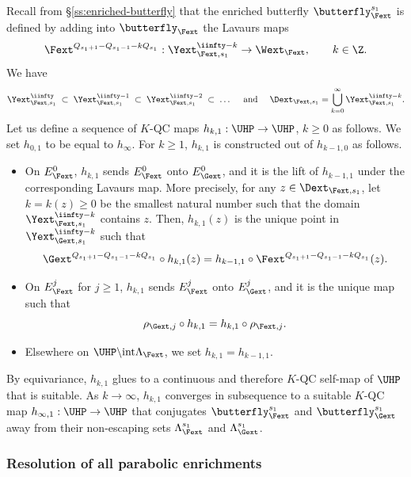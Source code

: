 \documentclass{amsart}
\begin{document}
Recall from \S\ref{ss:enriched-butterfly} that the enriched butterfly $\butterfly_{\Fext}^{s_1}$ is defined by adding into $\butterfly_{\Fext}$ the Lavaurs maps 
\[
\Fext^{Q_{s_1+1} - Q_{s_1-1} - kQ_{s_1}}: \Yext_{\Fext,s_1}^{\iinfty-k} \to \Wext_{\Fext}, \qquad k \in \Z.
\]
We have
\[
    \Yext_{\Fext,s_1}^{\iinfty} \;\subset\;
    \Yext_{\Fext,s_1}^{\iinfty-1} \;\subset\;
    \Yext_{\Fext,s_1}^{\iinfty-2} \;\subset\;
    \ldots 
    \quad \text{ and } \quad
    \Dext_{\Fext,s_1} = \bigcup_{k = 0}^\infty \Yext_{\Fext,s_1}^{\iinfty-k}.
\]
Let us define a sequence of $K$-QC maps $h_{k,1}: \UHP \to \UHP$, $k \geq 0$ as follows. 
We set $h_{0,1}$ to be equal to $h_\infty$. For $k \geq 1$, $h_{k,1}$ is constructed out of $h_{k-1,0}$ as follows.
\begin{itemize}
    \item On $E^0_{\Fext}$, $h_{k,1}$ sends $E^0_{\Fext}$ onto $E^0_{\Gext}$, and it is the lift of $h_{k-1,1}$ under the corresponding Lavaurs map. More precisely, for any $z \in \Dext_{\Fext,s_1}$, let $k=k(z) \geq 0$ be the smallest natural number such that the domain $\Yext_{\Fext,s_1}^{\iinfty-k}$ contains $z$. Then, $h_{k,1}(z)$ is the unique point in $\Yext_{\Gext,s_1}^{\iinfty-k}$ such that 
    \[
    \Gext^{Q_{s_1+1}-Q_{s_1-1}-kQ_{s_1}} \circ h_{k,1}(z) = h_{k-1,1} \circ \Fext^{Q_{s_1+1}-Q_{s_1-1}-kQ_{s_1}}(z).
    \]
    \item On $E^j_{\Fext}$ for $j \geq 1$, $h_{k,1}$ sends $E^j_{\Fext}$ onto $E^j_{\Gext}$, and it is the unique map such that 
    \[
    \rho_{\Gext, j} \circ h_{k,1} = h_{k,1} \circ \rho_{\Fext, j}.
    \]
    \item Elsewhere on $\UHP \backslash \textnormal{int}\Lambda_{\Fext}$, we set $h_{k,1} = h_{k-1,1}$. 
\end{itemize}
By equivariance, $h_{k,1}$ glues to a continuous and therefore $K$-QC self-map of $\UHP$ that is suitable.
As $k \to \infty$, $h_{k,1}$ converges in subsequence to a suitable $K$-QC map $h_{\infty, 1}: \UHP \to \UHP$ that conjugates $\butterfly_{\Fext}^{s_1}$ and $\butterfly_{\Gext}^{s_1}$ away from their non-escaping sets $\Lambda_{\Fext}^{s_1}$ and $\Lambda_{\Gext}^{s_1}$.

\subsubsection{Resolution of all parabolic enrichments}
\end{document}
